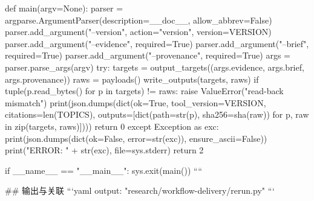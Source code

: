 def main(argv=None):
    parser = argparse.ArgumentParser(description=__doc__, allow_abbrev=False)
    parser.add_argument("--version", action="version", version=VERSION)
    parser.add_argument("--evidence", required=True)
    parser.add_argument("--brief", required=True)
    parser.add_argument("--provenance", required=True)
    args = parser.parse_args(argv)
    try:
        targets = output_targets((args.evidence, args.brief, args.provenance))
        raws = payloads()
        write_outputs(targets, raws)
        if tuple(p.read_bytes() for p in targets) != raws:
            raise ValueError("read-back mismatch")
        print(json.dumps(dict(ok=True, tool_version=VERSION, citations=len(TOPICS),
                              outputs=[dict(path=str(p), sha256=sha(raw)) for p, raw in zip(targets, raws)])))
        return 0
    except Exception as exc:
        print(json.dumps(dict(ok=False, error=str(exc)), ensure_ascii=False))
        print("ERROR: " + str(exc), file=sys.stderr)
        return 2

if __name__ == "__main__":
    sys.exit(main())
````

## 输出与关联
```yaml
output: "research/workflow-delivery/rerun.py"
```
